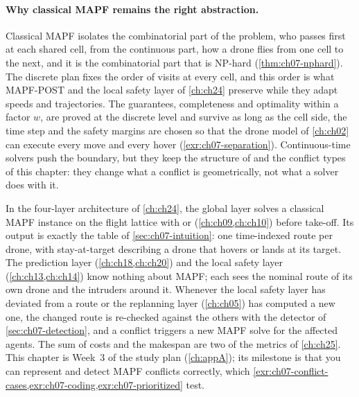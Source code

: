 \paragraph{Why classical MAPF remains the right abstraction.}
Classical MAPF isolates the combinatorial part of the problem, who passes
first at each shared cell, from the continuous part, how a drone flies from
one cell to the next, and it is the combinatorial part that is NP-hard
(\cref{thm:ch07-nphard}). The discrete plan fixes the order of visits at
every cell, and this order is what MAPF-POST and the local safety layer of
\cref{ch:ch24} preserve while they adapt speeds and trajectories. The
guarantees, completeness and optimality within a factor $w$, are proved at
the discrete level and survive as long as the cell side, the time step and
the safety margins are chosen so that the drone model of \cref{ch:ch02} can
execute every move and every hover (\cref{exr:ch07-separation}).
Continuous-time solvers push the boundary, but they keep the structure of
\cbs and the conflict types of this chapter: they change what a conflict is
geometrically, not what a solver does with it.

\begin{dronebox}
In the four-layer architecture of \cref{ch:ch24}, the global layer solves a
classical MAPF instance on the flight lattice with \cbs or \ecbs
(\cref{ch:ch09,ch:ch10}) before take-off. Its output is exactly the table of
\cref{sec:ch07-intuition}: one time-indexed route per drone, with
stay-at-target describing a drone that hovers or lands at its target. The
prediction layer (\cref{ch:ch18,ch:ch20}) and the local safety layer
(\cref{ch:ch13,ch:ch14}) know nothing about MAPF; each sees the nominal route
of its own drone and the intruders around it. Whenever the local safety layer has
deviated from a route or the replanning layer (\cref{ch:ch05}) has computed a
new one, the changed route is re-checked against the others with the detector
of \cref{sec:ch07-detection}, and a conflict triggers a new MAPF solve for the
affected agents. The sum of costs and the makespan are two of the metrics of
\cref{ch:ch25}. This chapter is Week~3 of the study plan (\cref{ch:appA}); its
milestone is that you can represent and detect MAPF conflicts correctly, which
\cref{exr:ch07-conflict-cases,exr:ch07-coding,exr:ch07-prioritized} test.
\end{dronebox}

